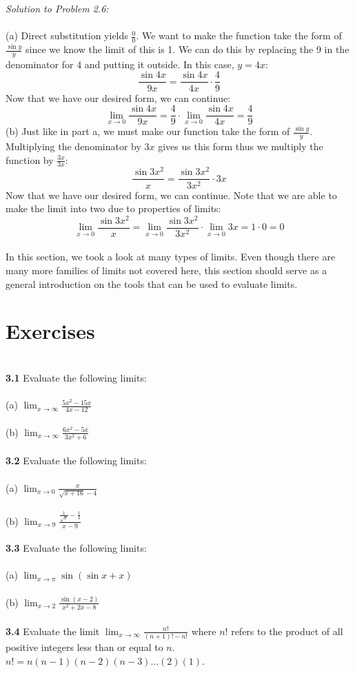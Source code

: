 \documentclass[11pt]{scrartcl}
\begin{document}
\noindent
\textit{Solution to Problem 2.6:}\\
\noindent\\
(a) Direct substitution yields $\frac{0}{0}$. We want to make the function take the form of $\frac{\sin y}{y}$ since we know the limit of this is 1. We can do this by replacing the 9 in the denominator for 4 and putting it outside. In this case, $y=4x$:
$$\frac{\sin 4x}{9x}=\frac{\sin 4x}{4x}\cdot\frac{4}{9}$$
Now that we have our desired form, we can continue:
$$\lim_{x \to 0} \frac{\sin 4x}{9x}=\frac{4}{9}\cdot\lim_{x \to 0} \frac{\sin 4x}{4x}=\frac{4}{9}$$
\noindent
(b) Just like in part a, we must make our function take the form of $\frac{\sin y}{y}$. Multiplying the denominator by $3x$ gives us this form thus we multiply the function by $\frac{3x}{3x}$:
$$\frac{\sin 3x^2}{x}=\frac{\sin 3x^2}{3x^2}\cdot3x$$
Now that we have our desired form, we can continue. Note that we are able to make the limit into two due to properties of limits:
$$\lim_{x \to 0} \frac{\sin 3x^2}{x}=\lim_{x \to 0} \frac{\sin 3x^2}{3x^2}\cdot\lim_{x \to 0} 3x=1\cdot0=0$$
\noindent\\
In this section, we took a look at many types of limits. Even though there are many more families of limits not covered here, this section should serve as a general introduction on the tools that can be used to evaluate limits.
\section{Exercises}\\
\noindent
\textbf{3.1} Evaluate the following limits:\\
\noindent\\
(a) $\lim_{x \to \infty} \frac{5x^2-15x}{4x-12}$\\
\noindent\\
(b) $\lim_{x \to \infty} \frac{6x^2-5x}{3x^2+6}$\\
\noindent\\
\textbf{3.2} Evaluate the following limits:\\
\noindent\\
(a) $\lim_{x \to 0} \frac{x}{\sqrt{x+16}-4}$\\
\noindent\\
(b) $\lim_{x \to 9} \frac{\frac{1}{\sqrt{x}}-\frac{1}{3}}{x-9}$\\
\noindent\\
\textbf{3.3} Evaluate the following limits:\\
\noindent\\
(a) $\lim_{x \to \pi} \sin (\sin x +x)$\\
\noindent\\
(b) $\lim_{x \to 2} \frac{\sin (x-2)}{x^2+2x-8}$\\
\noindent\\
\textbf{3.4} Evaluate the limit $\lim_{x \to \infty} \frac{n!}{(n+1)!-n!}$ where $n!$ refers to the product of all positive integers less than or equal to $n$. $n!=n(n-1)(n-2)(n-3)...(2)(1)$. \\
\noindent\\
\end{document}
